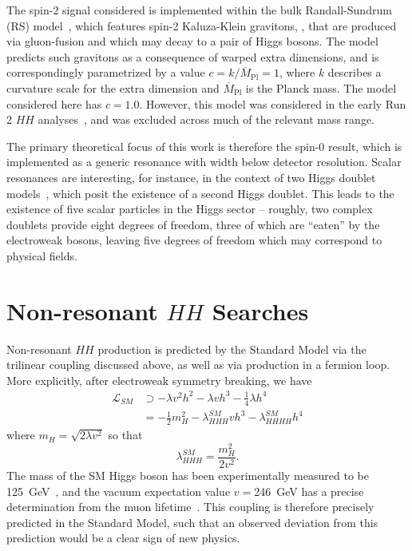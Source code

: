The spin-2 signal considered is implemented within the bulk Randall-Sundrum (RS)
model~\cite{Gravitons,Carvalho}, which features spin-2 Kaluza-Klein gravitons,
\PGrav, that are produced via gluon-fusion and which may decay to a pair of Higgs bosons. The model
predicts such gravitons as a consequence of warped extra dimensions, and is correspondingly 
parametrized by a value $c=k/\overline{M}_{\mathrm{Pl}} = 1$, where $k$ describes a curvature 
scale for the extra dimension and $\overline{M}_{\mathrm{Pl}}$ is the Planck mass. The model considered 
here has $c=1.0$. However, this model was considered in the early Run 2 $HH$ analyses~\cite{HDBS-2018-58},
and was excluded across much of the relevant mass range. 

The primary theoretical focus of this work is therefore the spin-0 result, which 
is implemented as a generic resonance with width below detector resolution. Scalar 
resonances are interesting, for instance, in the context of two Higgs doublet models~\cite{2HDM}, which 
posit the existence of a second Higgs doublet. This leads to the existence of five scalar
particles in the Higgs sector -- roughly, two complex doublets provide eight degrees of freedom, three of 
which are ``eaten'' by the electroweak bosons, leaving five degrees of freedom which may correspond
to physical fields.

\section{Non-resonant $HH$ Searches}
Non-resonant $HH$ production is predicted by the Standard Model via the trilinear coupling discussed above,
as well as via production in a fermion loop. More explicitly, after electroweak symmetry breaking, we have
\begin{align}
\mathcal{L}_{SM} &\supset -\lambda v^2h^2 - \lambda v h^3 - \frac{1}{4}\lambda h^4\\
&= -\frac{1}{2}m_{H}^2 - \lambda_{HHH}^{SM}vh^3 - \lambda_{HHHH}^{SM}h^4
\end{align}
where $m_{H} = \sqrt{2\lambda v^2}$ so that 
\begin{equation}
\lambda_{HHH}^{SM} = \frac{m_{H}^2}{2v^2}.
\end{equation}
The mass of the SM Higgs boson has been experimentally measured to be \SI{125}{\GeV}~\cite{Higgs-Mass}, and 
the vacuum expectation value $v=$\SI{246}{\GeV} has a precise determination from the muon lifetime~\cite{Higgs-vac}. 
This coupling is therefore precisely predicted in the Standard Model, such that an observed deviation from 
this prediction would be a clear sign of new physics. 

